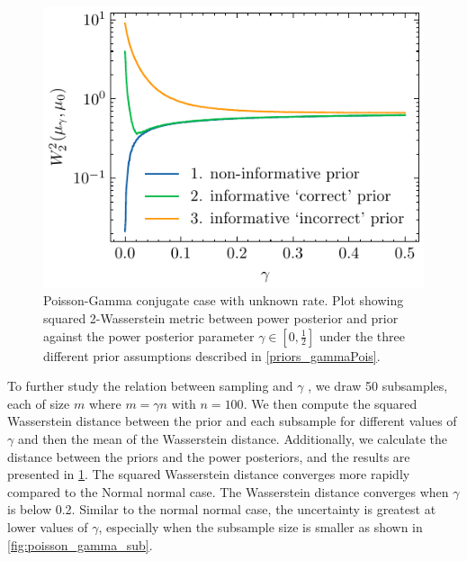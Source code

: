 \documentclass[12pt]{article}
\begin{document}
\begin{figure}[h]
    \begin{center}
   \includegraphics{imgs/poisson_gammawasserstein_distance.pdf}
       \end{center}
        \label{fig:pois_gama_was}
    \caption{Poisson-Gamma conjugate case with unknown rate. Plot showing squared
    	2-Wasserstein metric between power posterior and prior against the
    	power posterior parameter $\gamma \in [0, \frac{1}{2}]$ under the three
    	different prior assumptions described in  \cref{priors_gammaPois}.}
    \label{fig:poisson_ga_conju}
\end{figure}


To further study the relation between sampling and $\gamma$ , we draw 50 subsamples, each of size $m$ where $m =\gamma n$ with $n=100$. We then compute the squared Wasserstein distance between the prior and each subsample for different values of $\gamma$ and then the mean of the Wasserstein distance. Additionally, we calculate the distance between the priors and the power posteriors, and the results are presented in \cref{fig:poisson_ga_conju}. The squared Wasserstein distance converges more rapidly compared to the Normal normal case. The Wasserstein distance converges when $\gamma$ is below 0.2. Similar to the normal normal case, the uncertainty is greatest at lower values of $\gamma$, especially when the subsample size is smaller as shown in  \cref{fig:poisson_gamma_sub}. 
\end{document}
